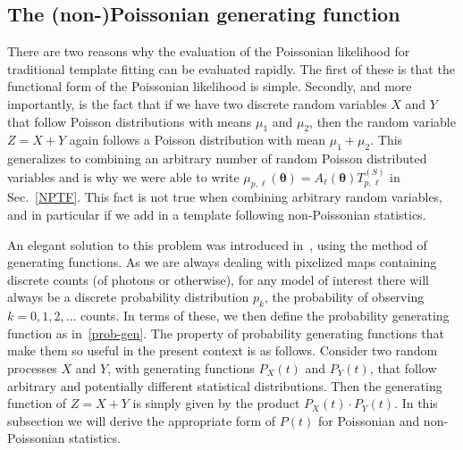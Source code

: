 \subsection{The (non-)Poissonian generating function}

There are two reasons why the evaluation of the Poissonian likelihood for traditional template fitting can be evaluated rapidly. The first of these is that the functional form of the Poissonian likelihood is simple. Secondly, and more importantly, is the fact that if we have two discrete random variables $X$ and $Y$ that follow Poisson distributions with means $\mu_1$ and $\mu_2$, then the random variable $Z = X + Y$ again follows a Poisson distribution with mean $\mu_1 + \mu_2$. This generalizes to combining an arbitrary number of random Poisson distributed variables and is why we were able to write $\mu_{p,\ell}(\bm{\theta}) = A_{\ell}(\bm{\theta})T_{p,\ell}^{(S)}$ in Sec.~\ref{NPTF}. This fact is not true when combining arbitrary random variables, and in particular if we add in a template following non-Poissonian statistics. 

An elegant solution to this problem was introduced in~\cite{Malyshev:2011zi}, using the method of generating functions. As we are always dealing with pixelized maps containing discrete counts (of photons or otherwise), for any model of interest there will always be a discrete probability distribution $p_k$, the probability of observing $k=0, 1, 2, \ldots$ counts. In terms of these, we then define the probability generating function as in~\eqref{prob-gen}. The property of probability generating functions that make them so useful in the present context is as follows. Consider two random processes $X$ and $Y$, with generating functions $P_X(t)$ and $P_Y(t)$, that follow arbitrary and potentially different statistical distributions. Then the generating function of $Z = X + Y$ is simply given by the product $P_X(t) \cdot P_Y(t)$. In this subsection we will derive the appropriate form of $P(t)$ for Poissonian and non-Poissonian statistics.

